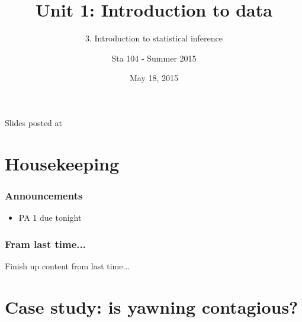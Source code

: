 \documentclass[11pt,containsverbatim,handout,xcolor=xelatex,dvipsnames,table]{beamer}
\title{Unit 1: Introduction to data}
\subtitle{3. Introduction to statistical inference}
\author{Sta 104 - Summer 2015}
\date{May 18, 2015}
\institute{Duke University, Department of Statistical Science}
\begin{document}



\begin{frame}[plain]

\titlepage
\vfill
{\scriptsize {} \hfill Slides posted at  \webLink{\CourseSite}{\CourseSite}}
\addtocounter{framenumber}{-1} 

\end{frame}


\section{Housekeeping}


\begin{frame}
\frametitle{Announcements}

\begin{itemize}

\item PA 1 due tonight

\end{itemize}

\end{frame}


\begin{frame}
\frametitle{Fram last time...}

\vfill

Finish up content from last time...

\vfill

\end{frame}


\section{Case study: is yawning contagious?}

\end{document}
